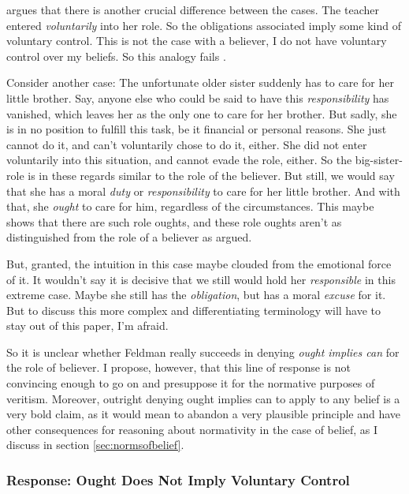 \documentclass[12pt,numbers=noenddot]{scrartcl}
\begin{document}
\textcite[686]{Peels2014-PEEADC} argues that there is another crucial difference between the cases. The teacher entered \emph{voluntarily} into her role. So the obligations associated imply some kind of voluntary control. This is not the case with a believer, I do not have voluntary control over my beliefs. So this analogy fails \autocite[687]{Peels2014-PEEADC}.

Consider another case: The unfortunate older sister suddenly has to care for her little brother. Say, anyone else who could be said to have this \emph{responsibility} has vanished, which leaves her as the only one to care for her brother. But sadly, she is in no position to fulfill this task, be it financial or personal reasons. She just cannot do it, and can't voluntarily chose to do it, either. She did not enter voluntarily into this situation, and cannot evade the role, either. So the big-sister-role is in these regards similar to the role of the believer. But still, we would say that she has a moral \emph{duty} or \emph{responsibility} to care for her little brother. And with that, she \emph{ought} to care for him, regardless of the circumstances. This maybe shows that there are such role oughts, and these role oughts aren't as distinguished from the role of a believer as argued.

But, granted, the intuition in this case maybe clouded from the emotional force of it. It wouldn't say it is decisive that we still would hold her \emph{responsible} in this extreme case. Maybe she still has the \emph{obligation}, but has a moral \emph{excuse} for it. But to discuss this more complex and differentiating terminology will have to stay out of this paper, I'm afraid.

So it is unclear whether Feldman really succeeds in denying \emph{ought implies can} for the role of believer. I propose, however, that this line of response is not convincing enough to go on and presuppose it for the normative purposes of veritism. Moreover, outright denying ought implies can to apply to any belief is a very bold claim, as it would mean to abandon a very plausible principle and have other consequences for reasoning about normativity in the case of belief, as I discuss in section \ref{sec:normsofbelief}.

\subsubsection{Response: Ought Does Not Imply Voluntary Control}\label{sec:oughtdoesnot}
\end{document}
